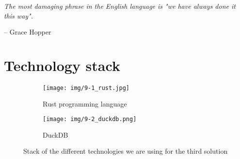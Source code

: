 \epigraph{\textit{The most damaging phrase in the English language is "we have always done it this way".}}{-- \textup{Grace Hopper}}

\section{Technology stack}

\begin{figure}[ht]
    \begin{subfigure}[c]{.45\textwidth}
        \centering
        \texttt{[image: img/9-1\_rust.jpg]}
        \caption{Rust programming language}
    \end{subfigure}%
    \hspace*{0.5em}
    \begin{subfigure}[c]{.45\textwidth}
        \centering
        \texttt{[image: img/9-2\_duckdb.png]}
        \caption{DuckDB}
    \end{subfigure}%
    \caption{Stack of the different technologies we are using for the third solution}
\end{figure}
